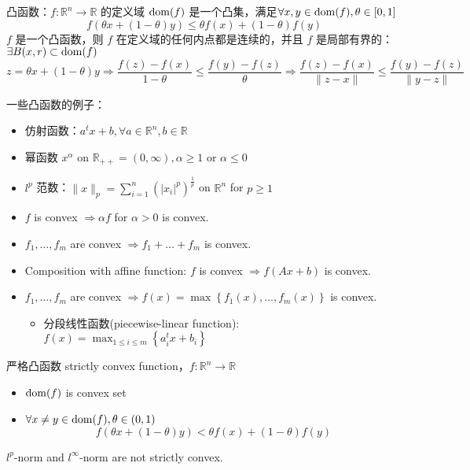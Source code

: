 \begin{remark}
    凸函数：$f: \mathbb{R}^n \to \mathbb{R}$ 的定义域 $\operatorname{dom}(f)$ 是一个凸集，满足$\forall x, y \in \operatorname{dom}(f), \theta \in [0, 1]$\[f(\theta x+(1-\theta) y) \leq \theta f(x)+(1-\theta) f(y)\]
    $f$ 是一个凸函数，则 $f$ 在定义域的任何内点都是连续的，并且 $f$ 是局部有界的：$\exists B(x, r) \subset \operatorname{dom}(f)$
    \[z=\theta x+(1-\theta) y \Longrightarrow \frac{f(z)-f(x)}{1-\theta} \leq \frac{f(y)-f(z)}{\theta} \Longrightarrow \frac{f(z)-f(x)}{\|z-x\|} \leq \frac{f(y)-f(z)}{\|y-z\|}\]
\end{remark}

\begin{remark}
    一些凸函数的例子：
    \begin{itemize}
        \item 仿射函数：$a^tx + b, \forall a \in \mathbb{R}^n, b \in \mathbb{R}$
        \item 幂函数 $x^\alpha$ on $\mathbb{R}_{++} = (0, \infty), \alpha \ge 1 $ or $\alpha \le 0$
        \item $l^p$ 范数：$\|x\|_p = \sum_{i = 1}^n (|x_i|^p)^\frac{1}{p}$ on $\mathbb{R}^n$ for $p \ge 1$
    \end{itemize}
\end{remark}

\begin{remark}

    \begin{itemize}
        \item $f$ is convex $\Longrightarrow \alpha f$ for $\alpha > 0$ is convex.
        \item $f_1, \dots, f_m$ are convex $\Longrightarrow f_1 + \dots + f_m$ is convex.
        \item Composition with affine function: $f$ is convex $\Longrightarrow f(Ax + b)$ is convex.
        \item $f_1, \dots, f_m$ are convex $\Longrightarrow f(x) = \max\left\{f_1(x), \dots, f_m(x)\right\}$ is convex.\begin{itemize}
            \item 分段线性函数(piecewise-linear function): $f(x) = \max_{1 \le i \le m} \left\{a_i^tx + b_i\right\}$
        \end{itemize}
    \end{itemize}
\end{remark}

\begin{remark}
    严格凸函数 strictly convex function，$f:\mathbb{R}^n \to \mathbb{R}$
    \begin{itemize}
        \item $\operatorname{dom}(f)$ is convex set
        \item $\forall x \neq y \in \operatorname{dom}(f), \theta \in (0, 1)$ \[f(\theta x + (1 - \theta)y) < \theta f(x) + (1 - \theta) f(y)\]
    \end{itemize}
    $l^p$-norm and $l^\infty$-norm are not strictly convex.
\end{remark}

